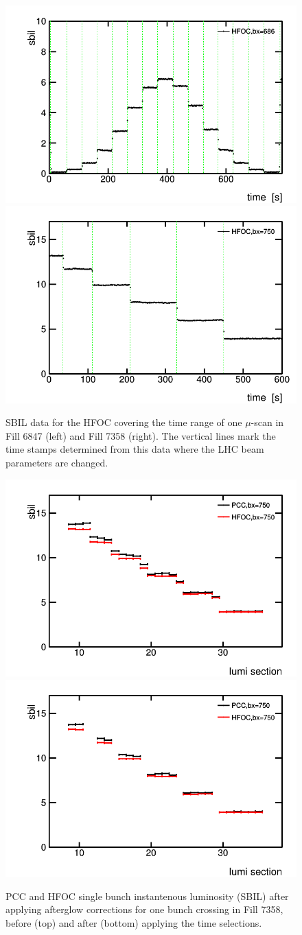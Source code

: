\begin{figure}[t]
  \begin{center}
    \includegraphics[width=0.47\linewidth]{plots/plot_lumi_vstime_6847.png}
    \includegraphics[width=0.47\linewidth]{plots/plot_lumi_vstime_7358.png}
    \caption{
      SBIL data for the HFOC covering the time range of one $\mu$-scan in Fill 6847 (left) and Fill 7358 (right). The vertical lines mark the time stamps determined from this data where the LHC beam parameters are changed.
    \label{fig:lumivstime}
    }
  \end{center}
\end{figure}


\newpage

\begin{figure}[t]
  \begin{center}
    \includegraphics[width=0.6\linewidth]{plots/plot_lumi_vsls_7358_before.png}
    \includegraphics[width=0.6\linewidth]{plots/plot_lumi_vsls_7358_after.png}
    \caption{
    PCC and HFOC single bunch instantenous luminosity (SBIL) after applying afterglow corrections for one bunch crossing in Fill 7358, before (top) and after (bottom) applying the time selections.
    \label{fig:lumivsls}
    }
  \end{center}
\end{figure}
